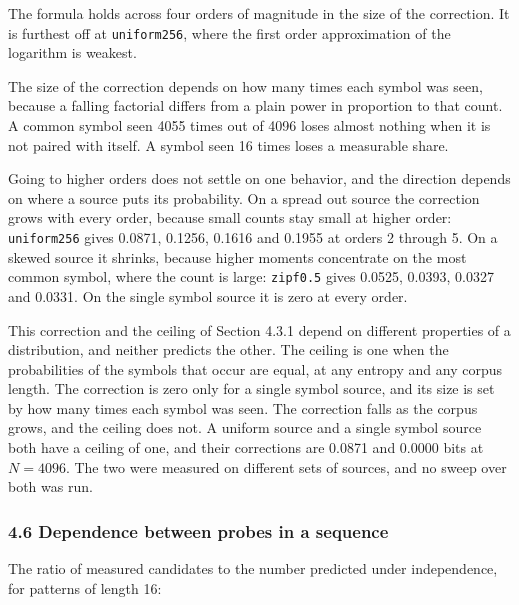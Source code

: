 The formula holds across four orders of magnitude in the size of the correction. It is furthest off at \texttt{uniform256}, where the first order approximation of the logarithm is weakest.

The size of the correction depends on how many times each symbol was seen, because a falling factorial differs from a plain power in proportion to that count. A common symbol seen 4055 times out of 4096 loses almost nothing when it is not paired with itself. A symbol seen 16 times loses a measurable share.

Going to higher orders does not settle on one behavior, and the direction depends on where a source puts its probability. On a spread out source the correction grows with every order, because small counts stay small at higher order: \texttt{uniform256} gives 0.0871, 0.1256, 0.1616 and 0.1955 at orders 2 through 5. On a skewed source it shrinks, because higher moments concentrate on the most common symbol, where the count is large: \texttt{zipf0.\allowbreak{}5} gives 0.0525, 0.0393, 0.0327 and 0.0331. On the single symbol source it is zero at every order.

This correction and the ceiling of Section 4.3.1 depend on different properties of a distribution, and neither predicts the other. The ceiling is one when the probabilities of the symbols that occur are equal, at any entropy and any corpus length. The correction is zero only for a single symbol source, and its size is set by how many times each symbol was seen. The correction falls as the corpus grows, and the ceiling does not. A uniform source and a single symbol source both have a ceiling of one, and their corrections are 0.0871 and 0.0000 bits at \(N = 4096\). The two were measured on different sets of sources, and no sweep over both was run.

\subsubsection{4.6 Dependence between probes in a sequence}

The ratio of measured candidates to the number predicted under independence, for patterns of length 16:

